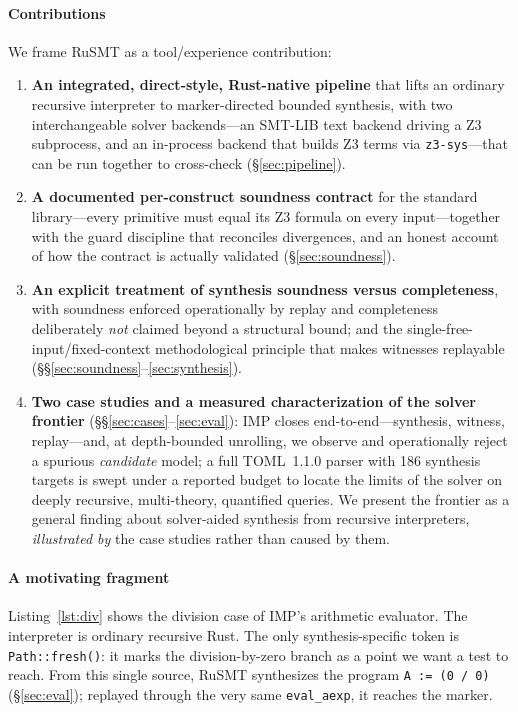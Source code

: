 \documentclass[sigplan,review,anonymous]{acmart}
\theoremstyle{definition}
\theoremstyle{remark}
\newcommand{\rusmt}{RuSMT}
\newcommand{\imp}{IMP}
\newcommand{\toml}{TOML}
\newcommand{\code}[1]{\texttt{#1}}
\begin{document}
\paragraph{Contributions}
We frame \rusmt{} as a tool/experience contribution:
\begin{enumerate}[leftmargin=1.4em,itemsep=1pt]
\item \textbf{An integrated, direct-style, Rust-native pipeline} that lifts an
ordinary recursive interpreter to marker-directed bounded synthesis, with two
interchangeable solver backends---an SMT-LIB text backend driving a Z3
subprocess, and an in-process backend that builds Z3 terms via
\code{z3-sys}---that can be run together to cross-check (\S\ref{sec:pipeline}).
\item \textbf{A documented per-construct soundness contract} for the standard
library---every primitive must equal its Z3 formula on every input---together
with the guard discipline that reconciles divergences, and an honest account of
how the contract is actually validated (\S\ref{sec:soundness}).
\item \textbf{An explicit treatment of synthesis soundness versus completeness},
with soundness enforced operationally by replay and completeness deliberately
\emph{not} claimed beyond a structural bound; and the
single-free-input/fixed-context methodological principle that makes witnesses
replayable (\S\S\ref{sec:soundness}--\ref{sec:synthesis}).
\item \textbf{Two case studies and a measured characterization of the solver
frontier} (\S\S\ref{sec:cases}--\ref{sec:eval}): \imp{} closes
end-to-end---synthesis, witness, replay---and, at depth-bounded unrolling, we
observe and operationally reject a spurious \emph{candidate} model; a full
\toml{}~1.1.0 parser with 186 synthesis targets is swept under a reported budget
to locate the limits of the solver on deeply recursive, multi-theory, quantified
queries. We present the frontier as a general finding about solver-aided
synthesis from recursive interpreters, \emph{illustrated by} the case studies
rather than caused by them.
\end{enumerate}

\paragraph{A motivating fragment}
Listing~\ref{lst:div} shows the division case of \imp{}'s arithmetic evaluator.
The interpreter is ordinary recursive Rust. The only synthesis-specific token is
\code{Path::fresh()}: it marks the division-by-zero branch as a point we want a
test to reach. From this single source, \rusmt{} synthesizes the program
\code{A := (0 / 0)} (\S\ref{sec:eval}); replayed through the very same
\code{eval\_aexp}, it reaches the marker.
\end{document}
